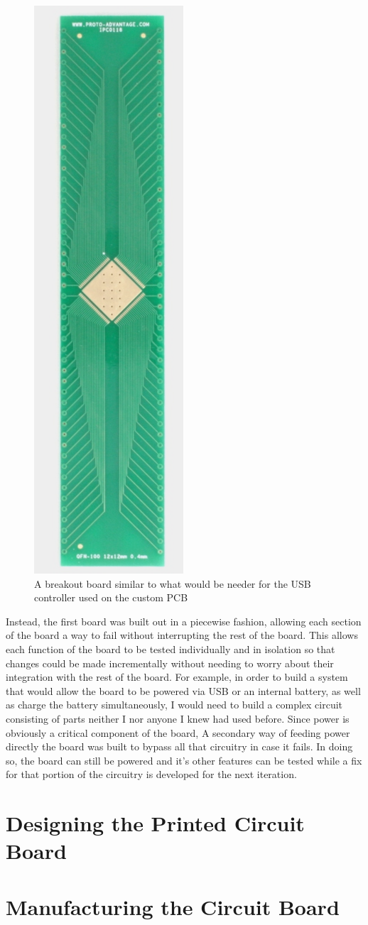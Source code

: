 \begin{figure}[h]
  \centering
  \includegraphics[height=0.9\textwidth,angle=90]{Figures/smt_breakout}
  \captionsetup{width=.8\linewidth}
  \caption[SMD Breakout Board]{A breakout board similar to what would be needer for the USB controller used on the custom PCB}
  \label{fig:smt_breakout}
\end{figure}

Instead, the first board was built out in a piecewise fashion, allowing each section of the board a way to fail without interrupting the rest of the board.
This allows each function of the board to be tested individually and in isolation so that changes could be made incrementally without needing to worry about their integration with the rest of the board.
For example, in order to build a system that would allow the board to be powered via USB or an internal battery, as well as charge the battery simultaneously, I would need to build a complex circuit consisting of parts neither I nor anyone I knew had used before.
Since power is obviously a critical component of the board, A secondary way of feeding power directly the board was built to bypass all that circuitry in case it fails.
In doing so, the board can still be powered and it's other features can be tested while a fix for that portion of the circuitry is developed for the next iteration.


\section{Designing the Printed Circuit Board}\label{sec:DesigningThePCB}

\todosection


\section{Manufacturing the Circuit Board}\label{sec:ManufacturingThePCB}

\todosection